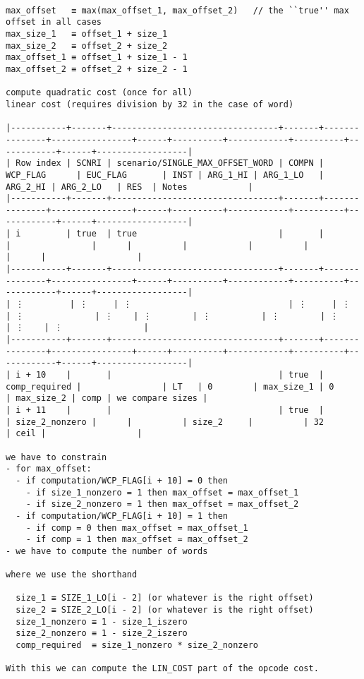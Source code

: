 \documentclass[varwidth=\maxdimen,margin=0.5cm,multi={verbatim}]{standalone}
\begin{document}
\begin{verbatim}

max_offset   ≡ max(max_offset_1, max_offset_2)   // the ``true'' max offset in all cases
max_size_1   ≡ offset_1 + size_1
max_size_2   ≡ offset_2 + size_2
max_offset_1 ≡ offset_1 + size_1 - 1
max_offset_2 ≡ offset_2 + size_2 - 1

compute quadratic cost (once for all)
linear cost (requires division by 32 in the case of word)

|-----------+-------+---------------------------------+-------+---------------+----------------+------+----------+------------+----------+------------+------+------------------|
| Row index | SCNRI | scenario/SINGLE_MAX_OFFSET_WORD | COMPN | WCP_FLAG      | EUC_FLAG       | INST | ARG_1_HI | ARG_1_LO   | ARG_2_HI | ARG_2_LO   | RES  | Notes            |
|-----------+-------+---------------------------------+-------+---------------+----------------+------+----------+------------+----------+------------+------+------------------|
| i         | true  | true                            |       |               |                |      |          |            |          |            |      |                  |
|-----------+-------+---------------------------------+-------+---------------+----------------+------+----------+------------+----------+------------+------+------------------|
| ⋮         | ⋮     | ⋮                               | ⋮     | ⋮             | ⋮              | ⋮    | ⋮        | ⋮          | ⋮        | ⋮          | ⋮    | ⋮                |
|-----------+-------+---------------------------------+-------+---------------+----------------+------+----------+------------+----------+------------+------+------------------|
| i + 10    |       |                                 | true  | comp_required |                | LT   | 0        | max_size_1 | 0        | max_size_2 | comp | we compare sizes |
| i + 11    |       |                                 | true  |               | size_2_nonzero |      |          | size_2     |          | 32         | ceil |                  |

we have to constrain
- for max_offset:
  - if computation/WCP_FLAG[i + 10] = 0 then
    - if size_1_nonzero = 1 then max_offset = max_offset_1
    - if size_2_nonzero = 1 then max_offset = max_offset_2
  - if computation/WCP_FLAG[i + 10] = 1 then
    - if comp = 0 then max_offset = max_offset_1
    - if comp = 1 then max_offset = max_offset_2
- we have to compute the number of words

where we use the shorthand

  size_1 ≡ SIZE_1_LO[i - 2] (or whatever is the right offset)
  size_2 ≡ SIZE_2_LO[i - 2] (or whatever is the right offset)
  size_1_nonzero ≡ 1 - size_1_iszero
  size_2_nonzero ≡ 1 - size_2_iszero
  comp_required  ≡ size_1_nonzero * size_2_nonzero

With this we can compute the LIN_COST part of the opcode cost.



\end{verbatim}
\end{document}
